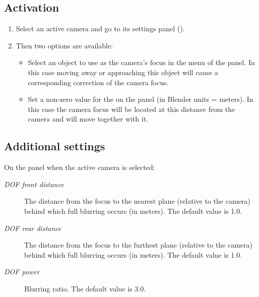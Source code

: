 \documentclass[a4paper,12pt,oneside]{sphinxmanual}
\begin{document}
\subsection{Activation}
\label{postprocessing_effects:id6}\begin{enumerate}
\item {} 
Select an active camera and go to its settings panel ().

\item {} 
Then two options are available:
\begin{itemize}
\item {} 
Select an object to use as the camera's focus in the  menu of the  panel. In this case moving away or approaching this object will cause a corresponding correction of the camera focus.

\item {} 
Set a non-zero value for the  on the  panel (in Blender units = meters). In this case the camera focus will be located at this distance from the camera and will move together with it.

\end{itemize}

\end{enumerate}


\subsection{Additional settings}
\label{postprocessing_effects:id7}
On the  panel when the active camera is selected:
\begin{description}
\item[{\emph{DOF front distance}}] \leavevmode
The distance from the focus to the nearest plane (relative to the camera) behind which full blurring occurs (in meters). The default value is 1.0.

\item[{\emph{DOF rear distance}}] \leavevmode
The distance from the focus to the furthest plane (relative to the camera) behind which full blurring occurs (in meters). The default value is 1.0.

\item[{\emph{DOF power}}] \leavevmode
Blurring ratio. The default value is 3.0.

\end{description}
\end{document}
